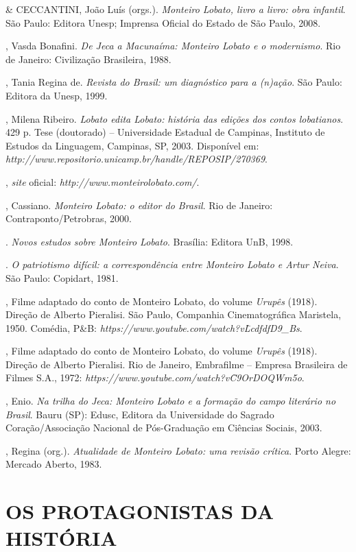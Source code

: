 \begin{bibliohedra}
\titidem \& CECCANTINI, João Luís (orgs.). \emph{Monteiro Lobato,
livro a livro: obra infantil}. São Paulo: Editora Unesp; Imprensa
Oficial do Estado de São Paulo, 2008.

, Vasda Bonafini. \emph{De Jeca a Macunaíma: Monteiro Lobato e o
modernismo}. Rio de Janeiro: Civilização Brasileira, 1988.

, Tania Regina de. \emph{Revista do Brasil: um diagnóstico para a
(n)ação}. São Paulo: Editora da Unesp, 1999.

, Milena Ribeiro. \emph{Lobato edita Lobato: história das edições
dos contos lobatianos}. 429 p. Tese (doutorado) -- Universidade Estadual
de Campinas, Instituto de Estudos da Linguagem, Campinas, SP, 2003.
Disponível em: \emph{http://www.repositorio.unicamp.br/handle/REPOSIP/270369}.

, \emph{site} oficial:
\emph{http://www.monteirolobato.com/}.

, Cassiano. \emph{Monteiro Lobato: o editor do Brasil}. Rio de
Janeiro: Contraponto/Petrobras, 2000.

\titidem. \emph{Novos estudos sobre Monteiro Lobato}. Brasília:
Editora UnB, 1998.

\titidem. \emph{O patriotismo difícil: a correspondência entre
Monteiro Lobato e Artur Neiva}. São Paulo: Copidart, 1981.

, Filme adaptado do conto de Monteiro
Lobato, do volume \emph{Urupês} (1918). Direção de Alberto Pieralisi.
São Paulo, Companhia Cinematográfica Maristela, 1950. Comédia, P\&B:
\emph{https://www.youtube.com/watch?v\=LcdfdfD9\_Bs}.

, Filme adaptado do conto de Monteiro
Lobato, do volume \emph{Urupês} (1918). Direção de Alberto Pieralisi.
Rio de Janeiro, Embrafilme -- Empresa Brasileira de Filmes S.A., 1972:
\emph{https://www.youtube.com/watch?v\=C9OrDOQWm5o}.

, Enio. \emph{Na trilha do Jeca: Monteiro Lobato e a formação do
campo literário no Brasil}. Bauru (SP): Edusc, Editora da Universidade
do Sagrado Coração/Associação Nacional de Pós-Graduação em Ciências
Sociais, 2003.

, Regina (org.). \emph{Atualidade de Monteiro Lobato: uma
revisão crítica}. Porto Alegre: Mercado Aberto, 1983.
\end{bibliohedra}

\part{OS PROTAGONISTAS DA HISTÓRIA}


